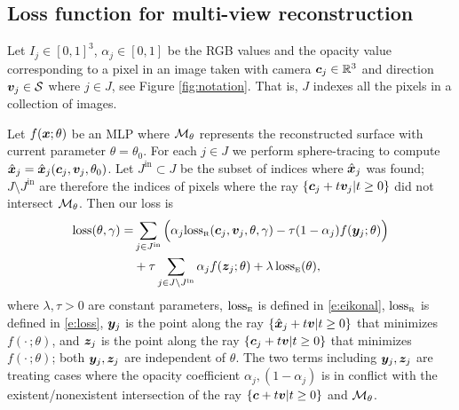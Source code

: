\documentclass[runningheads]{llncs}
\begin{document}
\subsection{Loss function for multi-view reconstruction}
Let $I_j\in [0,1]^3$, $\alpha_j\in[0,1]$ be the RGB values and the opacity value corresponding to a pixel in an image taken with camera ${\bm{c}}_j\in\mathbb R^3$ and direction ${\bm{v}}_j\in{\mathcal{S}}$ where $j\in J$, see Figure \ref{fig:notation}. That is, $J$ indexes all the pixels in a collection of images. 

Let $f({\bm{x}};\theta)$ be an MLP where ${\mathcal{M}}_\theta$ represents the reconstructed surface with current parameter $\theta=\theta_0$. For each $j\in J$ we perform sphere-tracing \cite{jiang2019sdfdiff} to compute ${\hat{\bm{x}}}_j={\hat{\bm{x}}}_j({\bm{c}}_j,{\bm{v}}_j,\theta_0)$. Let $J^{\scriptscriptstyle \mathrm{in}}\subset J$ be the subset of indices where ${\hat{\bm{x}}}_j$ was found; $J\setminus J^{\scriptscriptstyle \mathrm{in}}$ are therefore the indices of pixels where the ray $\left\{{\bm{c}}_j+t{\bm{v}}_j\vert t\geq 0\right\}$ did not intersect ${\mathcal{M}}_\theta$. 
Then our loss is
\begin{align}\label{e:loss_full}
    \mathrm{loss}(\theta,\gamma)    = &    \sum_{j\in J^{\scriptscriptstyle \mathrm{in}}} \Big(\alpha_j\mathrm{loss}_{\scriptscriptstyle\mathrm{R}}({\bm{c}}_j,{\bm{v}}_j,\theta,\gamma) - \tau(1-\alpha_j)f({{\bm{y}}}_j;\theta)  \Big ) \\ \nonumber & + \tau\sum_{j\in J\setminus J^{\scriptscriptstyle \mathrm{in}}} \alpha_j f({{\bm{z}}}_j;\theta) +\lambda\,\mathrm{loss}_{\scriptscriptstyle \mathrm{E}}(\theta),
\end{align}
where $\lambda,\tau>0$ are constant parameters, $\mathrm{loss}_{\scriptscriptstyle\mathrm{E}}$ is defined in \eqref{e:eikonal}, $\mathrm{loss}_{\scriptscriptstyle \mathrm{R}}$ is defined in \eqref{e:loss},  ${\bm{y}}_j$ is the point along the ray $\left\{{\hat{\bm{x}}}_j+t{\bm{v}}\vert t\geq 0\right\}$ that minimizes $f(\cdot\, ;\theta)$, and ${\bm{z}}_j$ is the point along the ray $\left\{{\bm{c}}_j+t{\bm{v}}\vert t\geq 0\right\}$ that minimizes $f(\cdot\,;\theta)$; both ${\bm{y}}_j,{\bm{z}}_j$ are independent of $\theta$. The two terms including ${\bm{y}}_j,{\bm{z}}_j$ are treating cases where the opacity coefficient $\alpha_j,(1-\alpha_j)$ is in conflict with the existent/nonexistent intersection of the ray $\left\{{\bm{c}}+t{\bm{v}}\vert t\geq 0\right\}$ and ${\mathcal{M}}_\theta$. 

\end{document}
